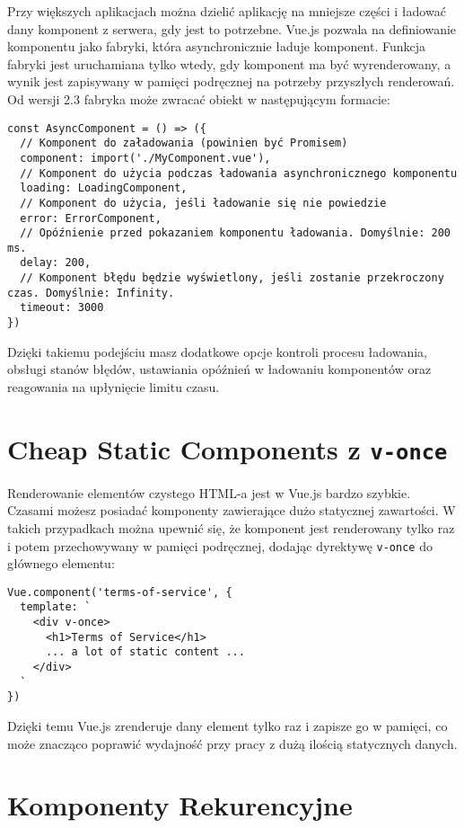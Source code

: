 \documentclass[a4paper,12pt]{article}
\begin{document}
Przy większych aplikacjach można dzielić aplikację na mniejsze części i ładować dany komponent z serwera, gdy jest to potrzebne. Vue.js pozwala na definiowanie komponentu jako fabryki, która asynchronicznie ładuje komponent. Funkcja fabryki jest uruchamiana tylko wtedy, gdy komponent ma być wyrenderowany, a wynik jest zapisywany w pamięci podręcznej na potrzeby przyszłych renderowań. Od wersji 2.3 fabryka może zwracać obiekt w następującym formacie:

\begin{lstlisting}
const AsyncComponent = () => ({
  // Komponent do załadowania (powinien być Promisem)
  component: import('./MyComponent.vue'),
  // Komponent do użycia podczas ładowania asynchronicznego komponentu
  loading: LoadingComponent,
  // Komponent do użycia, jeśli ładowanie się nie powiedzie
  error: ErrorComponent,
  // Opóźnienie przed pokazaniem komponentu ładowania. Domyślnie: 200 ms.
  delay: 200,
  // Komponent błędu będzie wyświetlony, jeśli zostanie przekroczony czas. Domyślnie: Infinity.
  timeout: 3000
})
\end{lstlisting}

Dzięki takiemu podejściu masz dodatkowe opcje kontroli procesu ładowania, obsługi stanów błędów, ustawiania opóźnień w ładowaniu komponentów oraz reagowania na upłynięcie limitu czasu.

\section{Cheap Static Components z \texttt{v-once}}

Renderowanie elementów czystego HTML-a jest w Vue.js bardzo szybkie. Czasami możesz posiadać komponenty zawierające dużo statycznej zawartości. W takich przypadkach można upewnić się, że komponent jest renderowany tylko raz i potem przechowywany w pamięci podręcznej, dodając dyrektywę \texttt{v-once} do głównego elementu:

\begin{lstlisting}
Vue.component('terms-of-service', {
  template: `
    <div v-once>
      <h1>Terms of Service</h1>
      ... a lot of static content ...
    </div>
  `
})
\end{lstlisting}

Dzięki temu Vue.js zrenderuje dany element tylko raz i zapisze go w pamięci, co może znacząco poprawić wydajność przy pracy z dużą ilością statycznych danych.

\section{Komponenty Rekurencyjne}
\end{document}
